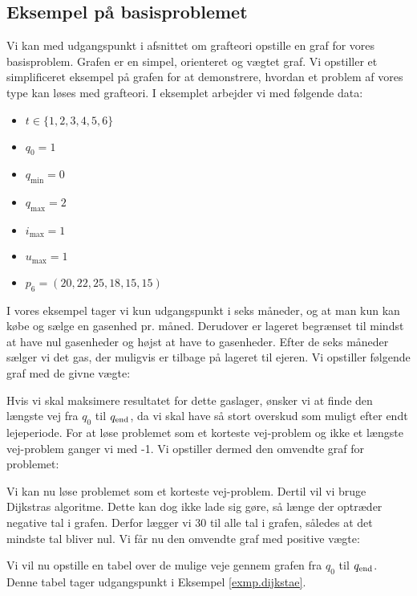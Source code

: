 \subsection{Eksempel på basisproblemet} \label{kap:graf_basis}
Vi kan med udgangspunkt i afsnittet om grafteori opstille en graf for vores basisproblem. Grafen er en simpel, orienteret og vægtet graf. Vi opstiller et simplificeret eksempel på grafen for at demonstrere, hvordan et problem af vores type kan løses med grafteori. I eksemplet arbejder vi med følgende data:
\begin{itemize}
  \item $t \in \{1,2,3,4,5,6\}$
  \item $q_{0}=1$
  \item $q_{\min}=0$
  \item $q_{\max}=2$
  \item $i_{\max}=1$
  \item $u_{\max}=1$
  \item $p_{6}=(20,22,25,18,15,15)$
\end{itemize}

I vores eksempel tager vi kun udgangspunkt i seks måneder, og at man kun kan købe og sælge en gasenhed pr. måned. Derudover er lageret begrænset til mindst at have nul gasenheder og højst at have to gasenheder. Efter de seks måneder sælger vi det gas, der muligvis er tilbage på lageret til ejeren. Vi opstiller følgende graf med de givne vægte:



Hvis vi skal maksimere resultatet for dette gaslager, ønsker vi at finde den længste vej fra $q_{0}$ til $q_{\textrm{end}}$, da vi skal have så stort overskud som muligt efter endt lejeperiode. For at løse problemet som et korteste vej-problem og ikke et længste vej-problem ganger vi med -1. Vi opstiller dermed den omvendte graf for problemet:



Vi kan nu løse problemet som et korteste vej-problem. Dertil vil vi bruge Dijkstras algoritme. Dette kan dog ikke lade sig gøre, så længe der optræder negative tal i grafen. Derfor lægger vi 30 til alle tal i grafen, således at det mindste tal bliver nul. Vi får nu den omvendte graf med positive vægte:




Vi vil nu opstille en tabel over de mulige veje gennem grafen fra $q_0$ til $q_{\textrm{end}}$. Denne tabel tager udgangspunkt i Eksempel \ref{exmp.dijkstae}.

